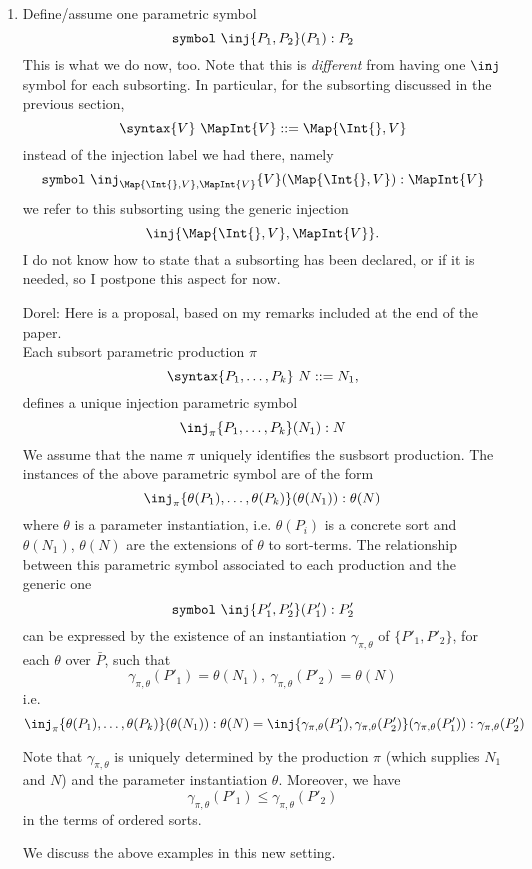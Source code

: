 \documentclass{article}
\newcommand\comment[2]{\par\noindent\color{red}#1: #2\color{black}\par\noindent}
\newcommand\dl{\comment{Dorel}}
\theoremstyle{definition}
\theoremstyle{definition}
\theoremstyle{definition}
\theoremstyle{definition}
\theoremstyle{definition}
\theoremstyle{theorem}
\theoremstyle{theorem}
\theoremstyle{theorem}
\theoremstyle{theorem}
\theoremstyle{theorem}
\newcommand{\KWsymbol}{\texttt{symbol}}
\begin{document}
\begin{enumerate}[label=(\arabic*)]
\item\label{assume-inj}
Define/assume one parametric symbol
\[\KWsymbol\ \inj\{P_1,P_2\}(P_1):P_2\]
This is what we do now, too.
Note that this is \emph{different} from having one \(\inj\)
symbol for each subsorting.
In particular, for the subsorting discussed in the previous section,
\[\syntax\{V\}\ \MapInt{V}::=\Map{\Int\{\},V}\]
instead of the injection label we had there, namely
\[\KWsymbol\ \inj_{\Map{\Int\{\},V},\MapInt{V}}\{V\}(\Map{\Int\{\},V}):\MapInt{V}\]
we refer to this subsorting using the generic injection
\[\inj\{\Map{\Int\{\},V},\MapInt{V}\}.\]
I do not know how to state that a subsorting has been declared,
or if it is needed, so I postpone this aspect for now.
\dl{
Here is a proposal, based on my remarks included at the end of the paper.
\\
Each subsort parametric production $\pi$
\[\syntax\{P_1,\ldots,P_k\}\ N::=N_1,\]
defines a unique injection parametric symbol
\[\inj_\pi\{P_1,\ldots,P_k\}(N_1):N\]
We assume that the name $\pi$ uniquely identifies the susbsort production. 
The instances of the above parametric symbol are of the form
\[\inj_\pi\{\theta(P_1),\ldots,\theta(P_k)\}(\theta(N_1)):\theta(N)\]
where $\theta$ is a parameter instantiation, i.e. $\theta(P_i)$ is a concrete sort
and $\theta(N_1)$, $\theta(N)$ are the extensions of $\theta$ to sort-terms. 
The relationship between this parametric symbol associated to each production and 
the generic one
\[\KWsymbol\ \inj\{P'_1,P'_2\}(P'_1):P'_2\]
can be expressed by the existence of an instantiation $\gamma_{\pi,\theta}$ of $\{P'_1,P'_2\}$, 
for each $\theta$  over $\bar{P}$, such that
\[\gamma_{\pi,\theta}(P'_1)=\theta(N_1),\ \gamma_{\pi,\theta}(P'_2)=\theta(N)\]
i.e.
\[\inj_\pi\{\theta(P_1),\ldots,\theta(P_k)\}(\theta(N_1)):\theta(N) = \inj\{\gamma_{\pi,\theta}(P'_1),\gamma_{\pi,\theta}(P'_2)\}(\gamma_{\pi,\theta}(P'_1)):\gamma_{\pi,\theta}(P'_2)\]

Note that $\gamma_{\pi,\theta}$ is uniquely determined by the production $\pi$ (which supplies $N_1$ and $N$) and the parameter instantiation $\theta$. Moreover, we have
\[\gamma_{\pi,\theta}(P'_1)\le \gamma_{\pi,\theta}(P'_2)\]
in the terms of ordered sorts.

We discuss the above examples in this new setting.

}
\end{enumerate}
\end{document}
